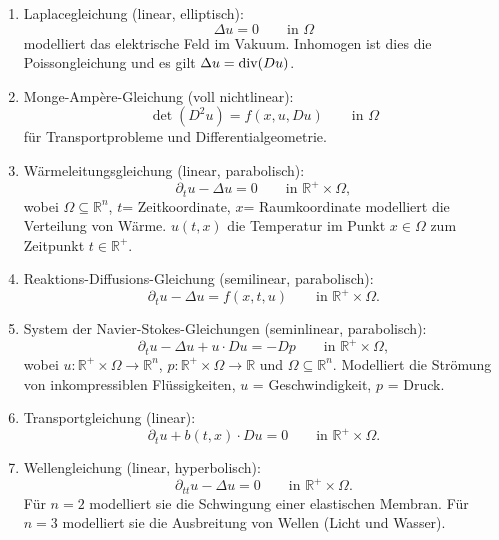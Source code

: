 \begin{beispiele}
	\begin{enumerate}[1.]
		\item Laplacegleichung (linear, elliptisch):
		\begin{equation}
			\Delta u = 0 \qquad \text{in }\Omega
		\end{equation}
		modelliert das elektrische Feld im Vakuum. Inhomogen ist dies die Poissongleichung und es gilt $\Delta u = \operatorname{div}(Du)$.
		\item Monge-Ampère-Gleichung (voll nichtlinear):
		\begin{equation}
			\det(D^2u)=f(x,u,Du) \qquad \text{in }\Omega
		\end{equation}
		für Transportprobleme und Differentialgeometrie.
		\item Wärmeleitungsgleichung (linear, parabolisch):
		\begin{equation}
			\partial_t u - \Delta u = 0 \qquad \text{in } \mathbb{R}^+ \times \Omega,
		\end{equation}
		wobei $\Omega \subseteq  \mathbb{R}^n$, $t$= Zeitkoordinate, $x$= Raumkoordinate modelliert die Verteilung von Wärme. $u(t,x)$ die Temperatur im Punkt $x \in \Omega$ zum Zeitpunkt $t \in \mathbb{R}^+$.
		\item Reaktions-Diffusions-Gleichung (semilinear, parabolisch):
		\begin{equation}
			\partial_t u - \Delta u = f(x,t,u) \qquad \text{in } \mathbb{R}^+ \times \Omega.
		\end{equation}
		\item System der Navier-Stokes-Gleichungen (seminlinear, parabolisch):
		\begin{equation}
			\partial_t u - \Delta u + u \cdot Du = -Dp \qquad \text{in } \mathbb{R}^+ \times \Omega,
		\end{equation}
		wobei $u: \mathbb{R}^+ \times \Omega \to  \mathbb{R}^n$, $p: \mathbb{R}^+ \times \Omega \to \mathbb{R}$ und $\Omega \subseteq  \mathbb{R}^n$. Modelliert die Strömung von inkompressiblen Flüssigkeiten, $u$ = Geschwindigkeit, $p$ = Druck.
		\item Transportgleichung (linear):
		\begin{equation}
			\partial_t u + b(t,x) \cdot Du = 0 \qquad \text{in } \mathbb{R}^+ \times \Omega.
		\end{equation}
		\item Wellengleichung (linear, hyperbolisch):
		\begin{equation}
			\partial_{tt}u - \Delta u = 0 \qquad \text{in } \mathbb{R}^+ \times \Omega.
		\end{equation}
		Für $n=2$ modelliert sie die Schwingung einer elastischen Membran. Für $n=3$ modelliert sie die Ausbreitung von Wellen (Licht und Wasser).
	\end{enumerate}
\end{beispiele}


